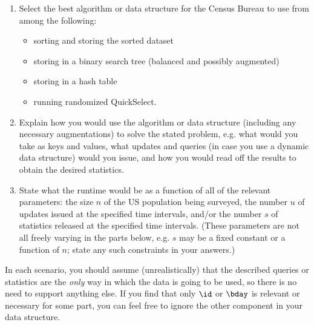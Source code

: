\documentclass[11pt]{article}
\begin{document}
\begin{enumerate}
    \begin{enumerate}[label=(\roman*)]
        \item Select the best algorithm or data structure for the Census Bureau to use from among the following: 
    \begin{itemize}
    \item sorting and storing the sorted dataset 
    \item storing in a binary search tree (balanced and possibly augmented)
    \item storing in a hash table
    \item running randomized QuickSelect. 
    \end{itemize}
    \item Explain how you would use the
    algorithm or data structure (including any necessary augmentations) to solve the stated problem, e.g. what would you take as keys and values, what updates and queries (in case you use a dynamic data structure) would you issue, and how you would read off the results to obtain the desired statistics. 
    \item State what the runtime would be as a function of all of the relevant parameters: the size $n$ of the US population being surveyed, the number $u$ of updates issued at the specified time intervals, and/or the number $s$ of statistics released at the specified time intervals.     (These parameters are not all freely varying in the parts below, e.g. $s$ may be a fixed constant or a function of $n$; state any such constraints in your answers.) 
    \end{enumerate}
    In each scenario, you should assume (unrealistically) that the described queries or statistics are the {\em only} way in which the data is going to be used, so there is no need to support anything else. If you find that only $\id$ or $\bday$ is relevant or necessary for some part, you can feel free to ignore the other component in your data structure. 

   
\begin{center}
\end{center}
\end{enumerate}
\end{document}
